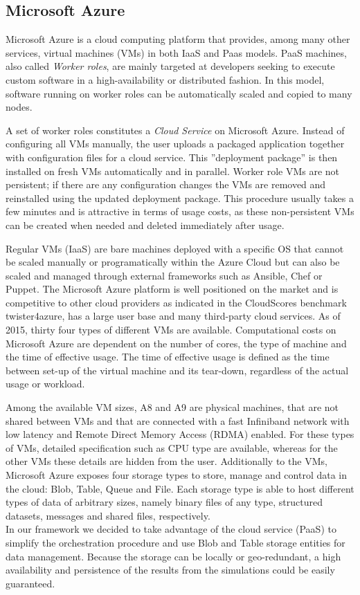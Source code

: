 \documentclass[a4paper,twoside]{article}
\begin{document}
\subsection{Microsoft Azure}

Microsoft Azure is a cloud computing platform that provides, among many other services, virtual machines (VMs) in both IaaS and Paas models. PaaS machines, also called \textit{Worker roles}, are mainly targeted at developers seeking to execute custom software in a high-availability or distributed fashion. In this model, software running on worker roles can be automatically scaled and copied to many nodes. 

A set of worker roles constitutes a {\it Cloud Service} on Microsoft Azure. Instead of configuring all VMs manually, the user uploads a packaged application together with configuration files for a cloud service. This ''deployment package'' is then installed on fresh VMs automatically and in parallel. Worker role VMs are not persistent; if there are any configuration changes the VMs are removed and reinstalled using the updated deployment package. This procedure usually takes a few minutes and is attractive in terms of usage costs, as these non-persistent VMs can be created when needed and deleted immediately after usage. 

Regular VMs (IaaS) are bare machines deployed with a specific OS that cannot be scaled manually or programatically within the Azure Cloud but can also be scaled and managed through external frameworks such as Ansible, Chef or Puppet. 
The Microsoft Azure platform is well positioned on the market and is competitive to other cloud providers as indicated in the CloudScores benchmark {twister4azure}, has a large user base and many third-party cloud services. As of 2015, thirty four types of different VMs are available. Computational costs on Microsoft Azure are dependent on the number of cores, the type of machine and the time of effective usage. The time of effective usage is defined as the time between set-up of the virtual machine and its tear-down, regardless of the actual usage or workload. 
 
Among the available VM sizes, A8 and A9 are physical machines, that are not shared between VMs and that are connected with a fast Infiniband network with low latency and Remote Direct Memory Access (RDMA) enabled. For these types of VMs, detailed specification such as CPU type are available, whereas for the other VMs these details are hidden from the user.  
Additionally to the VMs, Microsoft Azure exposes four storage types to store, manage and control data in the cloud: Blob, Table, Queue and File. Each storage type is able to host different types of data of arbitrary sizes, namely binary files of any type, structured datasets, messages and shared files, respectively. \\
In our framework we decided to take advantage of the cloud service (PaaS) to simplify the orchestration procedure and use Blob and Table storage entities for data management. Because the storage can be locally or geo-redundant, a high availability and persistence of the results from the simulations could be easily guaranteed.
\end{document}
